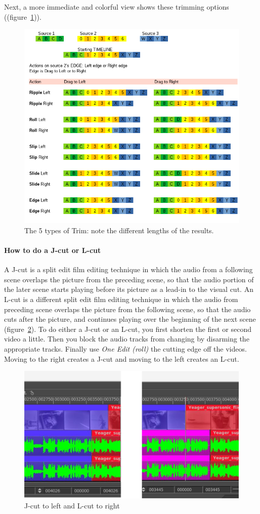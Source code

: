Next, a more immediate and colorful view shows these trimming options ((figure~\ref{fig:trim-color})).

\begin{figure}[htpb]
    \centering
    \includegraphics[width=0.8\linewidth]{images/trim-color.png}
    \caption{The 5 types of Trim: note the different lengths of the results.}
    \label{fig:trim-color}
\end{figure}

\paragraph{How to do a J-cut or L-cut} A J-cut is a split edit film editing technique in which the audio from a following scene overlaps the picture from the preceding scene, so that the audio portion of the later scene starts playing before its picture as a lead-in to the visual cut.  An L-cut is a different split edit film editing technique in which the audio from preceding scene overlaps the picture from the following scene, so that the audio cuts after the picture, and continues playing over the beginning of the next scene (figure~\ref{fig:j-cut}). To do either a J-cut or an L-cut, you first shorten the first or second video a little.  Then you block the audio tracks from changing by disarming the appropriate tracks.  Finally use \textit{One Edit (roll)} the cutting edge off the videos.  Moving to the right creates a J-cut and moving to the left creates an L-cut.
\begin{figure}[htpb]
    \centering
    \includegraphics[width=0.8\linewidth]{images/j-cut.png}
    \caption{J-cut to left and L-cut to right}
    \label{fig:j-cut}
\end{figure}

